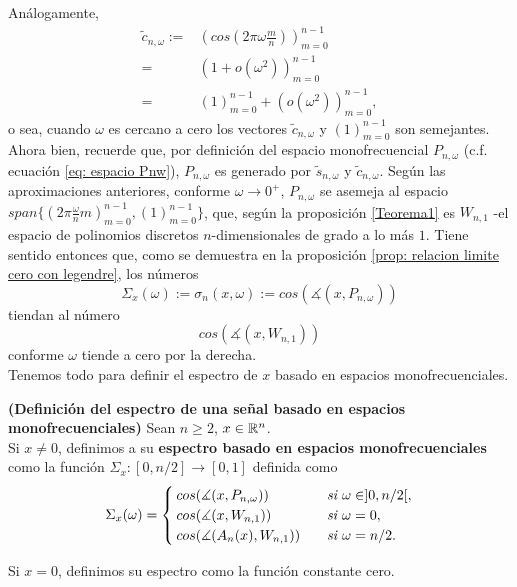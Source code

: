 Análogamente, 
\begin{align*}
\tilde{c}_{n, \omega} := & \left(cos\left(2 \pi \omega \frac{m}{n} \right)\right)_{m=0}^{n-1}\\
= & \left( 1 + o(\omega^{2}) \right)_{m=0}^{n-1} \\
= & \left( 1 \right)_{m=0}^{n-1} + 
\left( o(\omega^{2}) \right)_{m=0}^{n-1},
\end{align*}
o sea, cuando $\omega$ es cercano a cero
los vectores 
$\tilde{c}_{n, \omega}$ y $\left(1 \right)_{m=0}^{n-1} $
son semejantes. \\

Ahora bien, recuerde que, por definición del espacio
monofrecuencial $P_{n, \omega}$ (c.f. ecuación 
\eqref{eq: espacio Pnw}), 
$P_{n, \omega}$ es generado por 
$\tilde{s}_{n, \omega}$ y $\tilde{c}_{n, \omega}$. Según las aproximaciones
anteriores, conforme $\omega \rightarrow 0^{+}$, 
$P_{n, \omega}$ se asemeja al espacio
$span\{ \left( 2 \pi \frac{\omega}{n} m \right)_{m=0}^{n-1},
\left( 1 \right)_{m=0}^{n-1} \}$, que, según la proposición
\ref{Teorema1}
es $W_{n,1}$ -el espacio de polinomios discretos $n$-dimensionales
de grado a lo más $1$. Tiene sentido entonces que,
como se demuestra en la proposición 
\ref{prop: relacion limite cero con legendre},
los números
$$\Sigma_{x}(\omega) := \sigma_{n}(x, \omega) := 
cos( \measuredangle(x, P_{n, \omega}))$$
tiendan al número 
$$ cos( \measuredangle(x, W_{n,1}))$$
conforme $\omega$ tiende a cero por la derecha. \\



Tenemos todo para definir el espectro de $x$
basado en espacios monofrecuenciales.


\begin{defi}
\label{def: espectro monofrecuenciales inicial}
\textbf{(Definición del espectro de una señal
basado en espacios monofrecuenciales)}
Sean $n \geq 2$, $x \in \mathbb{R}^{n}$. \\

Si $x \neq 0$, definimos a su \textbf{espectro basado
en espacios monofrecuenciales} como la función 
$\Sigma_{x}: [0, n/2] \longrightarrow [0,1]$
definida como
\begin{align*}
\Sigma_{x}(\omega)= \begin{cases}
cos(\measuredangle(x, P_{n, \omega})) & 
\hspace{0.2cm} \textit{ si } \omega \in ]0, n/2[, \\
cos(\measuredangle(x, W_{n,1})) & \hspace{0.2cm} \textit{ si } \omega = 0, \\
cos(\measuredangle(A_{n}(x), W_{n,1})) & \hspace{0.2cm} \textit{ si } \omega = n/2.
\end{cases}
\end{align*}

Si $x = 0$, definimos su espectro como la 
función constante cero.
\end{defi}


